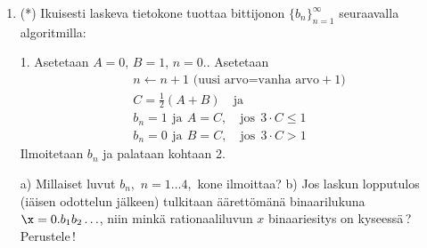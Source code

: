 \begin{enumerate}
\item (*)
Ikuisesti laskeva tietokone tuottaa bittijonon $\{b_n\}_{n=1}^\infty$ seuraavalla algoritmilla:

1. Asetetaan $A=0$, $B=1$, $n=0$.. Asetetaan 
\begin{align*}
&n\leftarrow n+1 \text{ (uusi arvo=vanha arvo}+1\text{)} \\
&C=\frac{1}{2}(A+B)\quad\text{ja} \\
&b_n=1\,\ \text{ja}\,\ A=C, \quad \text{jos}\ \ 3 \cdot C \le 1 \\
&b_n=0\,\ \text{ja}\,\ B=C, \quad \text{jos}\ \ 3 \cdot C > 1
\end{align*}
Ilmoitetaan $b_n$ ja palataan kohtaan 2.

a) Millaiset luvut $b_n,$ $n=1\ldots 4,$ kone ilmoittaa? \newline
b) Jos laskun lopputulos (iäisen odottelun jälkeen) tulkitaan äärettömänä binaarilukuna 
$\x=0.b_1b_2\ldots$, niin minkä rationaaliluvun $x$ binaariesitys on kyseessä\,? Perustele\,!

\end{enumerate}